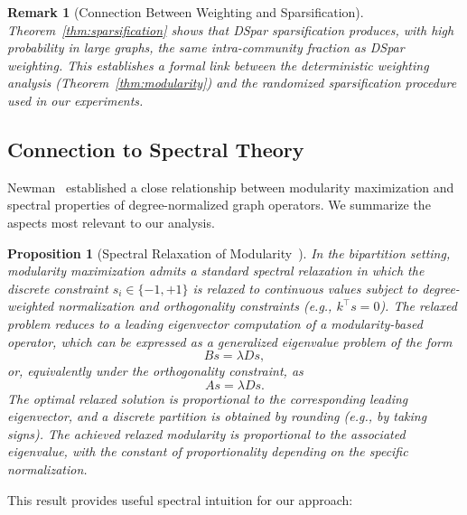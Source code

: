 \documentclass[10pt,journal,compsoc]{IEEEtran}
\newtheorem{proposition}{Proposition}
\newtheorem{remark}{Remark}
\begin{document}
\begin{remark}[Connection Between Weighting and Sparsification]
Theorem~\ref{thm:sparsification} shows that DSpar sparsification produces, with
high probability in large graphs, the same intra-community fraction as DSpar
weighting. This establishes a formal link between the deterministic weighting
analysis (Theorem~\ref{thm:modularity}) and the randomized sparsification
procedure used in our experiments.
\end{remark}


\subsection{Connection to Spectral Theory}

Newman~\cite{newman2013spectral} established a close relationship between
modularity maximization and spectral properties of degree-normalized graph
operators. We summarize the aspects most relevant to our analysis.

\begin{proposition}[Spectral Relaxation of Modularity~\cite{newman2006modularity,newman2013spectral}]
\label{prop:newman}
In the bipartition setting, modularity maximization admits a standard spectral
relaxation in which the discrete constraint $s_i \in \{-1,+1\}$ is relaxed to
continuous values subject to degree-weighted normalization and orthogonality
constraints (e.g., $k^\top s = 0$). The relaxed problem reduces to a leading
eigenvector computation of a modularity-based operator, which can be expressed
as a generalized eigenvalue problem of the form
\begin{equation}
B s = \lambda D s,
\end{equation}
or, equivalently under the orthogonality constraint, as
\begin{equation}
A s = \lambda D s.
\end{equation}
The optimal relaxed solution is proportional to the corresponding leading
eigenvector, and a discrete partition is obtained by rounding (e.g., by taking
signs). The achieved relaxed modularity is proportional to the associated
eigenvalue, with the constant of proportionality depending on the specific
normalization.
\end{proposition}

This result provides useful spectral intuition for our approach:
\end{document}
